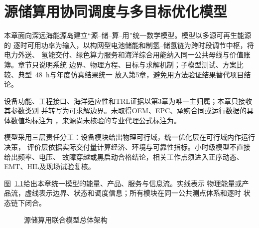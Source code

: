 \setcounter{chapter}{3}
\chapter{源储算用协同调度与多目标优化模型}

本章面向深远海能源岛建立“源--储--算--用”统一数学模型。模型以多源可再生能源的
逐时可用功率为输入，以构网型电池储能和制氢--储氢链为跨时段调节中枢，将电力外送、
氢能交付、绿色算力服务和海洋综合用能纳入同一公共母线与价值账簿。章节只说明系统
边界、物理方程、目标与求解机制；子模型测试、方案比较、典型~48~h与年度仿真结果统一
放入第5章，避免用方法验证结果替代项目结论。

设备功能、工程接口、海洋适应性和TRL证据以第3章为唯一主归属；本章只接收其参数类别
并转写为可求解边界。未取得OEM、EPC、承购合同或运行数据的具体数值均标注为
\assumptiontag，来源尚未核验的专业代理公式标注为\verifytag。

模型采用三层责任分工：设备模块给出物理可行域，统一优化层在可行域内作运行决策，
评价层依据实际交付量计算经济、环境与可靠性指标。小时级模型不直接给出频率、电压、
故障穿越或黑启动合格结论，相关工作点须进入正序动态、EMT、HIL及现场试验复核。

图~\ref{fig:ch4-model-architecture}给出本章统一模型的能量、产品、服务与信息流。实线表示
物理能量或产品流，虚线表示边界、状态和调度信息；所有模块在同一公共测点体系和逐时
状态链下闭合。
\begin{figure}[H]
\centering
\resizebox{\textwidth}{!}{}
\caption{源储算用联合模型总体架构}
\label{fig:ch4-model-architecture}
\end{figure}












